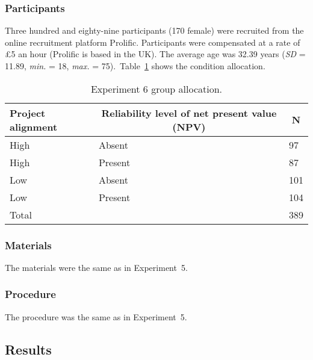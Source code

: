 \documentclass[a4paper, nobind]{templates/ociamthesis}
\theoremstyle{definition}
\theoremstyle{definition}
\theoremstyle{definition}
\theoremstyle{definition}
\theoremstyle{remark}
\begin{document}
\subsubsection{Participants}

Three hundred and eighty-nine participants (170 female) were recruited from the online recruitment platform Prolific. Participants were compensated at a rate of \pounds 5 an hour (Prolific is based in the UK). The average age was 32.39 years (\emph{SD} = 11.89, \emph{min.} = 18, \emph{max.} = 75).~Table~\ref{tab:condition-allocation-alignment-5}
shows the condition allocation.

\begin{table}[tbp]

\begin{center}
\begin{threeparttable}

\caption{\label{tab:condition-allocation-alignment-5}Experiment 6 group allocation.}

\begin{tabular}{lll}
\toprule
Project alignment & \multicolumn{1}{c}{Reliability level of net present value (NPV)} & \multicolumn{1}{c}{N}\\
\midrule
High & Absent & 97\\
High & Present & 87\\
Low & Absent & 101\\
Low & Present & 104\\
Total &  & 389\\
\bottomrule
\end{tabular}

\end{threeparttable}
\end{center}

\end{table}

\subsubsection{Materials}

The materials were the same as in Experiment~5.

\subsubsection{Procedure}

The procedure was the same as in Experiment~5.

\subsection{Results}
\end{document}
